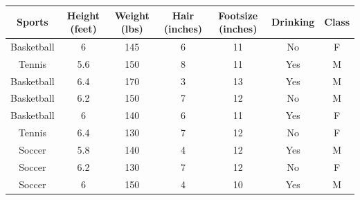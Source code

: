 \documentclass[11pt]{article}
\begin{document}
\vspace{.4cm}
{
\centering
\begin{tabular}{|c|c|c|c|c|c|c|}
	\hline
	Sports& Height (feet) & Weight (lbs)& Hair (inches) & Footsize (inches)& Drinking & Class\\
	\hline
	Basketball&  6& 145 & 6 & 11& No& F\\
	\hline
	Tennis& 5.6 & 150 &  8& 11& Yes&M\\
	\hline
	Basketball& 6.4 & 170 &  3& 13& Yes&M\\
	\hline
	Basketball &6.2  &150  & 7 & 12& No&M\\
	\hline
	Basketball&6 & 140 & 6 & 11& Yes& F\\
	\hline
	Tennis& 6.4 &130  &7  &12& No &F\\
	\hline
	Soccer&  5.8& 140 &4  &  12& Yes&M\\
	\hline
	Soccer& 6.2 &130  &7  &12& No &F\\
	\hline
	Soccer&  6& 150 &4  &  10& Yes&M\\
	\hline
\end{tabular}\par
}
%
\end{document}
